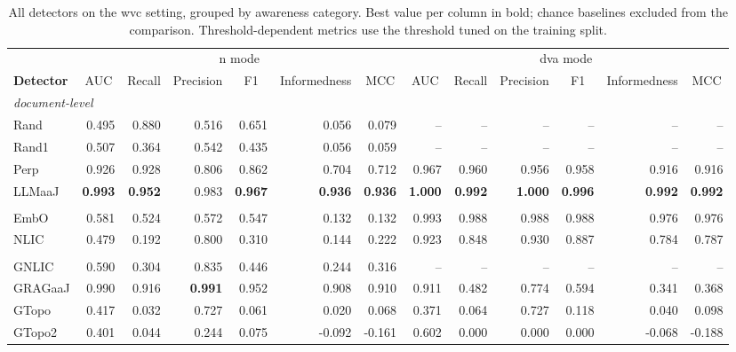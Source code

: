 \begin{table}[t]
  \centering
  \scriptsize
  \setlength{\tabcolsep}{2.5pt}
  \begin{tabular}{lrrrrrrrrrrrr}
    \toprule
    & \multicolumn{6}{c}{n mode} & \multicolumn{6}{c}{dva mode} \\
    \cmidrule(lr){2-7} \cmidrule(lr){8-13}
    \textbf{Detector} & \multicolumn{1}{c}{AUC} & \multicolumn{1}{c}{Recall} & \multicolumn{1}{c}{Precision} & \multicolumn{1}{c}{F1} & \multicolumn{1}{c}{Informedness} & \multicolumn{1}{c}{MCC} & \multicolumn{1}{c}{AUC} & \multicolumn{1}{c}{Recall} & \multicolumn{1}{c}{Precision} & \multicolumn{1}{c}{F1} & \multicolumn{1}{c}{Informedness} & \multicolumn{1}{c}{MCC} \\
    \midrule
    \multicolumn{13}{l}{\textit{document-level}} \\
    Rand & 0.495 & 0.880 & 0.516 & 0.651 & 0.056 & 0.079 & -- & -- & -- & -- & -- & -- \\
    Rand1 & 0.507 & 0.364 & 0.542 & 0.435 & 0.056 & 0.059 & -- & -- & -- & -- & -- & -- \\
    Perp & 0.926 & 0.928 & 0.806 & 0.862 & 0.704 & 0.712 & 0.967 & 0.960 & 0.956 & 0.958 & 0.916 & 0.916 \\
    LLMaaJ & \textbf{0.993} & \textbf{0.952} & 0.983 & \textbf{0.967} & \textbf{0.936} & \textbf{0.936} & \textbf{1.000} & \textbf{0.992} & \textbf{1.000} & \textbf{0.996} & \textbf{0.992} & \textbf{0.992} \\
    \addlinespace
    \multicolumn{13}{l}{\textit{embedding-aware}} \\
    EmbO & 0.581 & 0.524 & 0.572 & 0.547 & 0.132 & 0.132 & 0.993 & 0.988 & 0.988 & 0.988 & 0.976 & 0.976 \\
    NLIC & 0.479 & 0.192 & 0.800 & 0.310 & 0.144 & 0.222 & 0.923 & 0.848 & 0.930 & 0.887 & 0.784 & 0.787 \\
    \addlinespace
    \multicolumn{13}{l}{\textit{grag-aware}} \\
    GNLIC & 0.590 & 0.304 & 0.835 & 0.446 & 0.244 & 0.316 & -- & -- & -- & -- & -- & -- \\
    GRAGaaJ & 0.990 & 0.916 & \textbf{0.991} & 0.952 & 0.908 & 0.910 & 0.911 & 0.482 & 0.774 & 0.594 & 0.341 & 0.368 \\
    GTopo & 0.417 & 0.032 & 0.727 & 0.061 & 0.020 & 0.068 & 0.371 & 0.064 & 0.727 & 0.118 & 0.040 & 0.098 \\
    GTopo2 & 0.401 & 0.044 & 0.244 & 0.075 & -0.092 & -0.161 & 0.602 & 0.000 & 0.000 & 0.000 & -0.068 & -0.188 \\
    \bottomrule
  \end{tabular}
  \caption{All detectors on the wvc setting, grouped by awareness category. Best value per column in bold; chance baselines excluded from the comparison. Threshold-dependent metrics use the threshold tuned on the training split.}
  \label{tab:setting-wvc}
\end{table}
